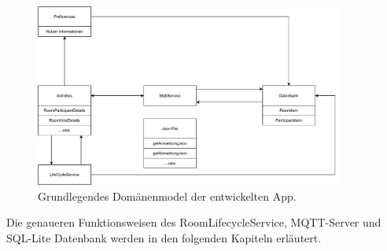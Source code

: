 \begin{figure}
	\centering
	\includegraphics[width =0.9\textwidth]{images/DomaenenModel.pdf}
	\caption{Grundlegendes Domänenmodel der entwickelten App.}
	\label{img:dmodel}
\end{figure}
Die genaueren Funktionsweisen des RoomLifecycleService, MQTT-Server und SQL-Lite Datenbank werden in den folgenden Kapiteln erläutert.


